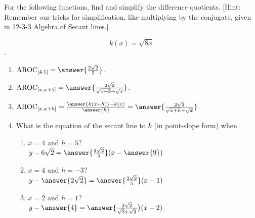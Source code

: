 \documentclass{ximera}
\author{Elizabeth Campolongo}
\begin{document}
\begin{exercise}

For the following functions, 
find and simplify the difference quotients. [Hint: Remember our tricks for simplification, like multiplying by the conjugate, given in 12-3-3 Algebra of Secant lines.]

 $$k(x)= \sqrt{8x}$$.

\begin{enumerate}

\item $\av_{[4,1]} = \answer{\frac{2\sqrt{2}}{5}}$.

\item $\av_{[x,x+5]} =  \answer{\frac{2\sqrt{2}}{\sqrt{x+5} + \sqrt{x}}}$.

\item $\av_{[x,x+h]} = \frac{\answer{k(x+h)}-k(x)}{\answer{h}}   = \answer{\frac{2\sqrt{2}}{\sqrt{x+h} + \sqrt{x}}}$.  

\item What is the equation of the secant line to $k$ (in point-slope form) when
\begin{enumerate}
\item $x = 4$ and $h=5$? \\
$y-6\sqrt{2} = \answer{\frac{2\sqrt{2}}{5}}(x-\answer{9})$

\item $x = 4$ and $h = -3$? \\
$y - \answer{2\sqrt{2}} = \answer{\frac{2\sqrt{2}}{5}}(x-1)$

\item $x = 2$ and $h= 1$? \\
$y - \answer{4} = \answer{\frac{2\sqrt{2}}{\sqrt{3} + \sqrt{2}}}(x-2)$.
\end{enumerate}

	
\end{enumerate}
\end{exercise}
\end{document}
